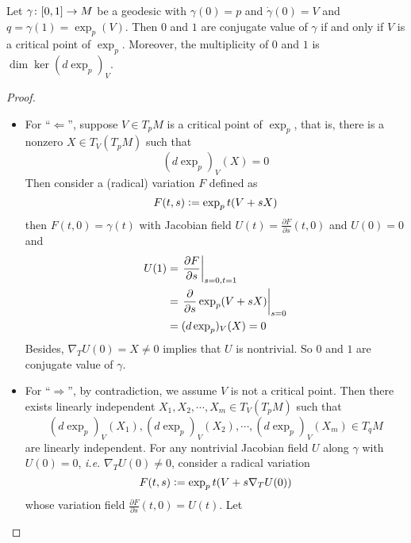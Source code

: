\begin{enumerate}[label=\arabic{*}.]
	\begin{thm}
		Let $\gamma \colon [0,1] \rightarrow M$ be a geodesic with $\gamma(0) = p$ and $\dot{\gamma}(0) = V$ and $q = \gamma(1) = \exp_p(V)$. Then $0$ and $1$ are conjugate value of $\gamma$ if and only if $V$ is a critical point of $\exp_p$. Moreover, the multiplicity of $0$ and $1$ is $\dim\ker (d\exp_p)_V$.
	\end{thm}
	\begin{proof}
		\begin{itemize}
			\item For ``$\Leftarrow$'', suppose $V \in T_pM$ is a critical point of $\exp_p$, that is, there is a nonzero $X \in T_V(T_pM)$ such that 
			\begin{equation*}
				(d\exp_p)_V(X) = 0
			\end{equation*}
			Then consider a (radical) variation $F$ defined as
			\begin{equation*}
				F(t,s) \vcentcolon= \exp_pt(V+sX)
			\end{equation*}
			then $F(t,0) = \gamma(t)$ with Jacobian field $U(t) = \frac{\partial F}{\partial s}(t,0)$ and $U(0) = 0$ and
			\begin{equation*}
				\begin{aligned}
					U(1) &= \left.\frac{\partial F}{\partial s}\right\lvert_{s=0,t=1}\\
					&= \left.\frac{\partial }{\partial s}\exp_p(V + sX)\right\lvert_{s=0}\\
					&= (d\exp_p)_V(X) = 0
				\end{aligned}
			\end{equation*}
			Besides, $\nabla_TU(0) = X \neq 0$ implies that $U$ is nontrivial. So $0$ and $1$ are conjugate value of $\gamma$.
			\item For ``$\Rightarrow$'', by contradiction, we assume $V$ is not a critical point. Then there exists linearly independent $X_1,X_2,\cdots,X_m \in T_V(T_pM)$ such that
			\begin{equation*}
				(d\exp_p)_V(X_1),(d\exp_p)_V(X_2),\cdots,(d\exp_p)_V(X_m) \in T_qM
			\end{equation*}
			are linearly independent. For any nontrivial Jacobian field $U$ along $\gamma$ with $U(0) = 0$, \emph{i.e.} $\nabla_TU(0) \neq 0$, consider a radical variation
			\begin{equation*}
				F(t,s) \vcentcolon= \exp_pt(V+s\nabla_TU(0))
			\end{equation*}
			whose variation field $\frac{\partial F}{\partial s}(t,0) = U(t)$. Let
			\begin{equation*}

\end{equation*}
\end{itemize}
\end{proof}
\end{enumerate}
